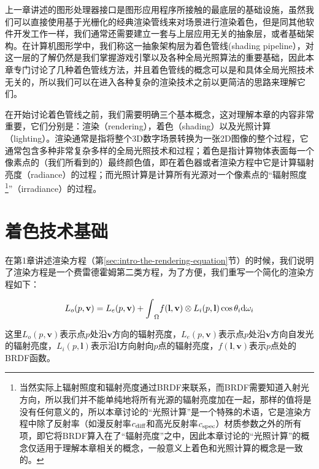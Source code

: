上一章讲述的图形处理器接口是图形应用程序所接触的最底层的基础设施，虽然我们可以直接使用基于光栅化的经典渲染管线来对场景进行渲染着色，但是同其他软件开发工作一样，我们通常还需要建立一套与上层应用无关的抽象层，或者基础架构。在计算机图形学中，我们称这一抽象架构层为着色管线(shading pipeline），对这一层的了解仍然是我们掌握游戏引擎以及各种全局光照算法的重要基础，因此本章专门讨论了几种着色管线方法，并且着色管线的概念可以是和具体全局光照技术无关的，所以我们可以在进入各种复杂的渲染技术之前以更简洁的思路来理解它们。

在开始讨论着色管线之前，我们需要明确三个基本概念，这对理解本章的内容非常重要，它们分别是：渲染（rendering），着色（shading）以及光照计算（lighting）。渲染通常是指将整个3D数字场景转换为一张2D图像的整个过程，它通常包含多种非常复杂多样的全局光照技术和过程；着色是指计算物体表面每一个像素点的（我们所看到的）最终颜色值，即在着色器或者渲染方程中它是计算辐射亮度（radiance）的过程；而光照计算是计算所有光源对一个像素点的“辐射照度\footnote{当然实际上辐射照度和辐射亮度通过BRDF来联系，而BRDF需要知道入射光方向，所以我们并不能单纯地将所有光源的辐射亮度加在一起，那样的值将是没有任何意义的，所以本章讨论的“光照计算”是一个特殊的术语，它是渲染方程中除了反射率（如漫反射率$c_{\rm diff}$和高光反射率$c_{\rm spec}$）材质参数之外的所有项，即它将BRDF算入在了“辐射亮度”之中，因此本章讨论的“光照计算”的概念仅适用于理解本章相关的概念，一般意义上着色和光照计算的概念是一致的。}”（irradiance）的过程。



\section{着色技术基础}
在第1章讲述渲染方程（第\ref{sec:intro-the-rendering-equation}节）的时候，我们说明了渲染方程是一个费雷德霍姆第二类方程，为了方便，我们重写一个简化的渲染方程如下：

\begin{equation}\label{eq:shade-rendering-equation}
	L_o(p,\mathbf{v})=L_e(p,\mathbf{v})+{\rm \int}_\Omega f(\mathbf{l},\mathbf{v})\otimes L_i(p,\mathbf{l})\cos{\theta_i}{\rm d}\omega_i
\end{equation}

这里$L_o(p,\mathbf{v})$表示点$p$处沿$\mathbf{v}$方向的辐射亮度，$L_e(p,\mathbf{v})$表示点$p$处沿$\mathbf{v}$方向自发光的辐射亮度，$L_i(p,\mathbf{l})$表示沿$\mathbf{l}$方向射向$p$点的辐射亮度，$f(\mathbf{l},\mathbf{v})$表示$p$点处的BRDF函数。

